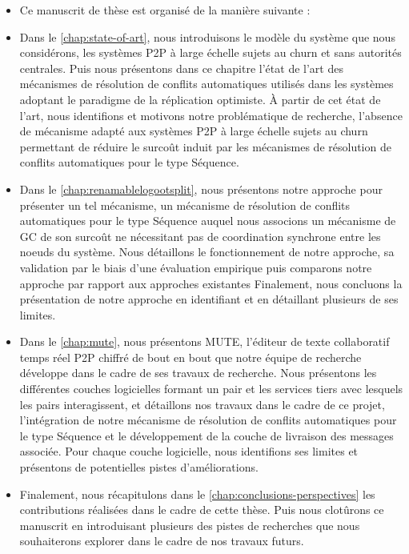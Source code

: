 \begin{itemize}
    \item Ce manuscrit de thèse est organisé de la manière suivante :
    \item Dans le \autoref{chap:state-of-art}, nous introduisons le modèle du système que nous considérons, \ie les systèmes \ac{P2P} à large échelle sujets au churn et sans autorités centrales.
        Puis nous présentons dans ce chapitre l'état de l'art des mécanismes de résolution de conflits automatiques utilisés dans les systèmes adoptant le paradigme de la réplication optimiste.
        À partir de cet état de l'art, nous identifions et motivons notre problématique de recherche, \ie l'absence de mécanisme adapté aux systèmes \ac{P2P} à large échelle sujets au churn permettant de réduire le surcoût induit par les mécanismes de résolution de conflits automatiques pour le type Séquence.
    \item Dans le \autoref{chap:renamablelogootsplit}, nous présentons notre approche pour présenter un tel mécanisme, \ie un mécanisme de résolution de conflits automatiques pour le type Séquence auquel nous associons un mécanisme de \ac{GC} de son surcoût ne nécessitant pas de coordination synchrone entre les noeuds du système.
        Nous détaillons le fonctionnement de notre approche, sa validation par le biais d'une évaluation empirique puis comparons notre approche par rapport aux approches existantes
        Finalement, nous concluons la présentation de notre approche en identifiant et en détaillant plusieurs de ses limites.
    \item Dans le \autoref{chap:mute}, nous présentons \ac{MUTE}, l'éditeur de texte collaboratif temps réel \ac{P2P} chiffré de bout en bout que notre équipe de recherche développe dans le cadre de ses travaux de recherche.
        Nous présentons les différentes couches logicielles formant un pair et les services tiers avec lesquels les pairs interagissent, et détaillons nos travaux dans le cadre de ce projet, \ie l'intégration de notre mécanisme de résolution de conflits automatiques pour le type Séquence et le développement de la couche de livraison des messages associée.
        Pour chaque couche logicielle, nous identifions ses limites et présentons de potentielles pistes d'améliorations.
    \item Finalement, nous récapitulons dans le \autoref{chap:conclusions-perspectives} les contributions réalisées dans le cadre de cette thèse.
        Puis nous clotûrons ce manuscrit en introduisant plusieurs des pistes de recherches que nous souhaiterons explorer dans le cadre de nos travaux futurs.
\end{itemize}
